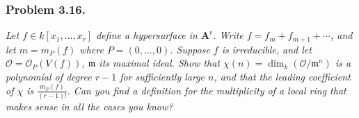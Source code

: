 \documentclass{article}
\begin{document}



\subsubsection*{Problem 3.16.}
\emph{Let $f \in k[x_1,\ldots,x_r]$ define a hypersurface in $\mathbf{A}^r$.
Write $f = f_m + f_{m+1} + \cdots$,
and let $m = m_P(f)$ where $P = (0, \ldots, 0)$.
Suppose $f$ is irreducible,
and let $\mathscr{O} = \mathscr{O}_P(V(f))$,
$\mathfrak{m}$ its maximal ideal.
Show that $\chi(n) = \dim_k(\mathscr{O}/\mathfrak{m}^n)$ is a polynomial of degree $r-1$
for sufficiently large $n$,
and that the leading coefficient of $\chi$ is $\frac{m_P(f)}{(r-1)!}$.
Can you find a definition for the multiplicity of a local ring
that makes sense in all the cases you know?} \\
\end{document}
